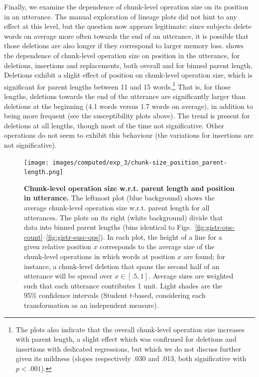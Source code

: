 \documentclass[a4paper,fleqn]{cas-dc}
\begin{document}
Finally, we examine the dependence of chunk-level operation size on its
position in an utterance. The manual exploration of lineage plots did
not hint to any effect at this level, but the question now appears
legitimate: since subjects delete words on average more often towards
the end of an utterance, it is possible that those deletions are also
longer if they correspond to larger memory loss.
 shows the dependence of chunk-level
operation size on position in the utterance, for deletions, insertions
and replacements, both overall and for binned parent length. Deletions
exhibit a slight effect of position on chunk-level operation size, which
is significant for parent lengths between 11 and 15 words.\footnote{The
  plots also indicate that the overall chunk-level operation size
  increases with parent length, a slight effect which was confirmed for
  deletions and insertions with dedicated regressions, but which we do
  not discuss further given its mildness (slopes respectively .030 and
  .013, both significative with \(p < .001\)).} That is, for those
lengths, deletions towards the end of the utterance are significantly
larger than deletions at the beginning (4.1 words versus 1.7 words on
average), in addition to being more frequent (see the susceptibility
plots above). The trend is present for deletions at all lengths, though
most of the time not significative. Other operations do not seem to
exhibit this behaviour (the variations for insertions are not
significative).

\begin{figure}
  \centering
  \texttt{[image: images/computed/exp\_3/chunk-size\_position\_parent-length.png]}
  \caption[Chunk-level operation size w.r.t. parent length and position in utterance]{
  \textbf{Chunk-level operation size w.r.t. parent length and position in utterance.}
  The leftmost plot (blue background) shows the average chunk-level operation size w.r.t. parent length for all utterances.
  The plots on its right (white background) divide that data into binned parent lengths (bins identical to Figs.~\ref{fig:gistr-ops-count}--\ref{fig:gistr-susc-ops}).
  In each plot, the height of a line for a given relative position $x$ corresponds to the average size of the chunk-level operations in which words at position $x$ are found;
  for instance, a chunk-level deletion that spans the second half of an utterance will be spread over $x \in [.5, 1]$.
  Average sizes are weighted such that each utterance contributes 1 unit.
  Light shades are the 95\% confidence intervals (Student $t$-based, considering each transformation as an independent measure).
  }
  \label{fig:gistr-chunk-size}
\end{figure}
\end{document}
